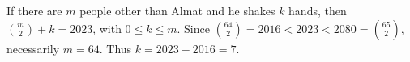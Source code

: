 If there are $m$ people other than Almat and he shakes $k$ hands, then $\binom m2+k=2023$, with $0\le k\le m$. Since $\binom{64}{2}=2016<2023<2080=\binom{65}{2}$, necessarily $m=64$. Thus $k=2023-2016=\boxed7$.
